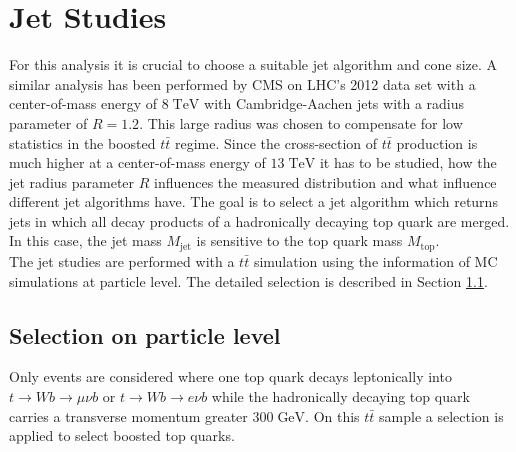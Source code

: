 \section{Jet Studies}
	For this analysis it is crucial to choose a suitable jet algorithm and cone size. A similar analysis has been performed by CMS on LHC's 2012 data set with a center-of-mass energy of $8\;\text{TeV}$ with Cambridge-Aachen jets with a radius parameter of $R=1.2$. This large radius was chosen to compensate for low statistics in the boosted $t\bar{t}$ regime. Since the cross-section of $t\bar{t}$ production is much higher at a center-of-mass energy of $13\;\text{TeV}$ it has to be studied, how the jet radius parameter $R$ influences the measured distribution and what influence different jet algorithms have. The goal is to select a jet algorithm which returns jets in which all decay products of a hadronically decaying top quark are merged. In this case, the jet mass $M_\text{jet}$ is sensitive to the top quark mass $M_\text{top}$.
	\\
	The jet studies are performed with a $t\bar{t}$ simulation using the information of MC simulations at particle level. The detailed selection is described in Section \ref{sec:GenSel}.

\subsection{Selection on particle level}
\label{sec:GenSel}
	Only events are considered where one top quark decays leptonically into $t\rightarrow Wb\rightarrow \mu \nu b$ or $t\rightarrow Wb\rightarrow e \nu b$ while the hadronically decaying top quark carries a transverse momentum greater $300\;\text{GeV}$. On this $t\bar{t}$ sample a selection is applied to select boosted top quarks.

